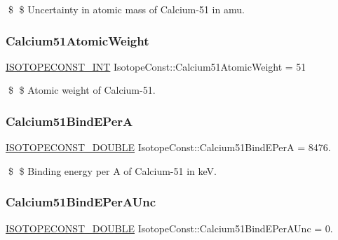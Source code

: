 \$ \$ Uncertainty in atomic mass of Calcium-\/51 in amu. \mbox{\label{group___isotope_const-_calcium-_ca51_ga2e94246098738261c063e210fcd53146}} 
\subsubsection{\texorpdfstring{Calcium51\+Atomic\+Weight}{Calcium51AtomicWeight}}
{\footnotesize\ttfamily \mbox{\hyperlink{group___isotope_const-_macros_ga5f18360b3e99483a35c32d789e62621c}{I\+S\+O\+T\+O\+P\+E\+C\+O\+N\+S\+T\+\_\+\+I\+NT}} Isotope\+Const\+::\+Calcium51\+Atomic\+Weight = 51}

\$ \$ Atomic weight of Calcium-\/51. \mbox{\label{group___isotope_const-_calcium-_ca51_gaeb35fe4b8632c996955658866bda9d88}} 
\subsubsection{\texorpdfstring{Calcium51\+Bind\+E\+PerA}{Calcium51BindEPerA}}
{\footnotesize\ttfamily \mbox{\hyperlink{group___isotope_const-_macros_ga8f45a7272ce02c0b4c65c44636ed719a}{I\+S\+O\+T\+O\+P\+E\+C\+O\+N\+S\+T\+\_\+\+D\+O\+U\+B\+LE}} Isotope\+Const\+::\+Calcium51\+Bind\+E\+PerA = 8476.}

\$ \$ Binding energy per A of Calcium-\/51 in keV. \mbox{\label{group___isotope_const-_calcium-_ca51_ga489981cafe1132403a782a521e0e40c4}} 
\subsubsection{\texorpdfstring{Calcium51\+Bind\+E\+Per\+A\+Unc}{Calcium51BindEPerAUnc}}
{\footnotesize\ttfamily \mbox{\hyperlink{group___isotope_const-_macros_ga8f45a7272ce02c0b4c65c44636ed719a}{I\+S\+O\+T\+O\+P\+E\+C\+O\+N\+S\+T\+\_\+\+D\+O\+U\+B\+LE}} Isotope\+Const\+::\+Calcium51\+Bind\+E\+Per\+A\+Unc = 0.}

